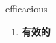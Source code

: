 
\begin{frame}
{\huge efficacious}
\begin{center}
\begin{enumerate}\Large
  \item \textbf{有效的}
\end{enumerate}
\end{center}
\end{frame}

